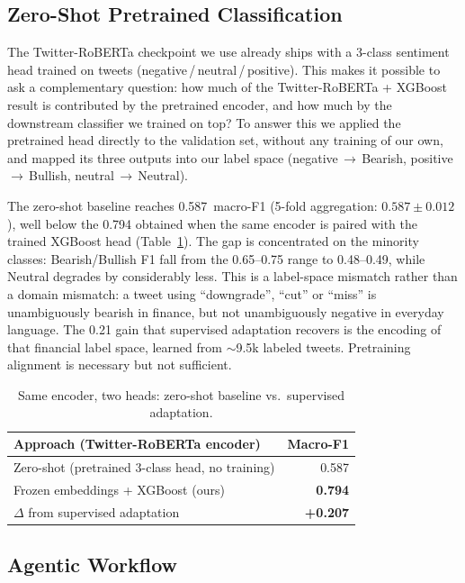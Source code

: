 \documentclass[12pt,a4paper]{article}
\begin{document}
\subsection{Zero-Shot Pretrained Classification}
\label{sec:zero_shot}

The Twitter-RoBERTa checkpoint we use already ships with a 3-class sentiment head trained on tweets (negative\,/\,neutral\,/\,positive). This makes it possible to ask a complementary question: how much of the Twitter-RoBERTa + XGBoost result is contributed by the pretrained encoder, and how much by the downstream classifier we trained on top? To answer this we applied the pretrained head directly to the validation set, without any training of our own, and mapped its three outputs into our label space (negative\,$\rightarrow$\,Bearish, positive\,$\rightarrow$\,Bullish, neutral\,$\rightarrow$\,Neutral).

The zero-shot baseline reaches 0.587~macro-F1 (5-fold aggregation: $0.587 \pm 0.012$), well below the 0.794 obtained when the same encoder is paired with the trained XGBoost head (Table~\ref{tab:zero_shot}). The gap is concentrated on the minority classes: Bearish/Bullish F1 fall from the 0.65--0.75 range to 0.48--0.49, while Neutral degrades by considerably less. This is a label-space mismatch rather than a domain mismatch: a tweet using ``downgrade'', ``cut'' or ``miss'' is unambiguously bearish in finance, but not unambiguously negative in everyday language. The 0.21 gain that supervised adaptation recovers is the encoding of that financial label space, learned from $\sim$9.5k labeled tweets. Pretraining alignment is necessary but not sufficient.

\begin{table}[!htbp]
\centering
\begin{tabular}{lr}
\toprule
\textbf{Approach (Twitter-RoBERTa encoder)} & \textbf{Macro-F1} \\
\midrule
Zero-shot (pretrained 3-class head, no training)   & 0.587 \\
Frozen embeddings + XGBoost (ours)                 & \textbf{0.794} \\
\midrule
$\Delta$ from supervised adaptation                & \textbf{+0.207} \\
\bottomrule
\end{tabular}
\caption{Same encoder, two heads: zero-shot baseline vs.\ supervised adaptation.}
\label{tab:zero_shot}
\end{table}

\subsection{Agentic Workflow}
\end{document}
